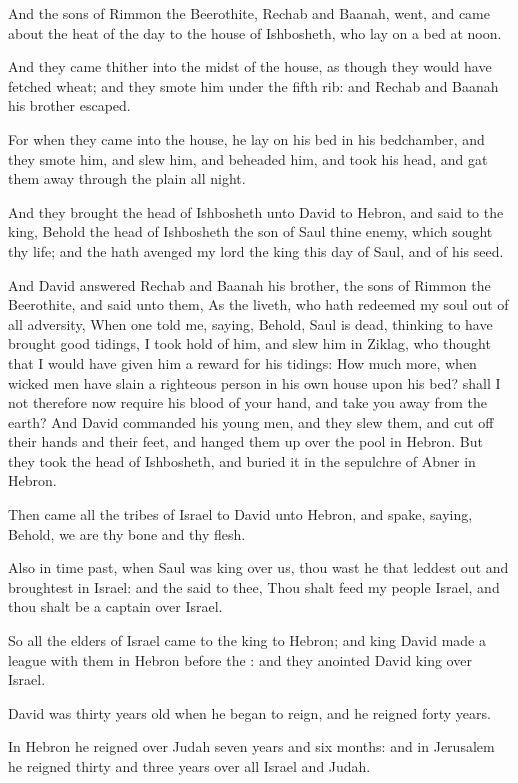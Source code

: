 \Verse And the sons of Rimmon the Beerothite, Rechab and Baanah, went, and came about the heat of the day to the house of Ishbosheth, who lay on a bed at noon.

\Verse And they came thither into the midst of the house, as though they would have fetched wheat; and they smote him under the fifth rib: and Rechab and Baanah his brother escaped.

\Verse For when they came into the house, he lay on his bed in his bedchamber, and they smote him, and slew him, and beheaded him, and took his head, and gat them away through the plain all night.

\Verse And they brought the head of Ishbosheth unto David to Hebron, and said to the king, Behold the head of Ishbosheth the son of Saul thine enemy, which sought thy life; and the \LORD hath avenged my lord the king this day of Saul, and of his seed.

\Verse And David answered Rechab and Baanah his brother, the sons of Rimmon the Beerothite, and said unto them, As the \LORD liveth, who hath redeemed my soul out of all adversity, \Verse When one told me, saying, Behold, Saul is dead, thinking to have brought good tidings, I took hold of him, and slew him in Ziklag, who thought that I would have given him a reward for his tidings: \Verse How much more, when wicked men have slain a righteous person in his own house upon his bed? shall I not therefore now require his blood of your hand, and take you away from the earth?  \Verse And David commanded his young men, and they slew them, and cut off their hands and their feet, and hanged them up over the pool in Hebron. But they took the head of Ishbosheth, and buried it in the sepulchre of Abner in Hebron.


\Chapter
\Verse Then came all the tribes of Israel to David unto Hebron, and spake, saying, Behold, we are thy bone and thy flesh.

\Verse Also in time past, when Saul was king over us, thou wast he that leddest out and broughtest in Israel: and the \LORD said to thee, Thou shalt feed my people Israel, and thou shalt be a captain over Israel.

\Verse So all the elders of Israel came to the king to Hebron; and king David made a league with them in Hebron before the \LORD: and they anointed David king over Israel.

\Verse David was thirty years old when he began to reign, and he reigned forty years.

\Verse In Hebron he reigned over Judah seven years and six months: and in Jerusalem he reigned thirty and three years over all Israel and Judah.

